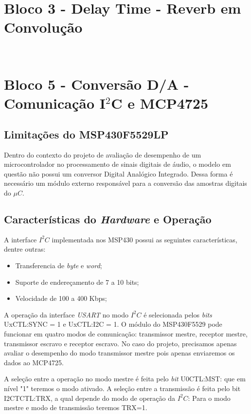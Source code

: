 		
\section{Bloco 3 - Delay Time - Reverb em Convolução}
	\

\section{Bloco 5 - Conversão D/A - Comunicação I$^2$C e MCP4725}
	
	
	\subsection{Limitações do MSP430F5529LP}
		
		Dentro do contexto do projeto de avaliação de desempenho de um microcontrolador no processamento de sinais digitais de áudio, o modelo em questão não possui um conversor Digital Analógico Integrado. Dessa forma é necessário um módulo externo responsável para a conversão das amostras digitais do $\mu C$.
		
	\subsection{Características do \textit{Hardware} e Operação}
	
		A interface $ I^2C $ implementada nos MSP430 possui as seguintes características, dentre outras:
		\begin{itemize}
			\item Transferencia de \textit{byte} e \textit{word};
			\item Suporte de endereçamento de 7 a 10 bits;
			\item Velocidade de 100 a 400 Kbps;
		\end{itemize}
	
		A operação da interface \textit{USART} no modo $ I^2C $ é selecionada pelos \textit{bits} UxCTL:SYNC = 1 e UxCTL:I2C = 1. O módulo do MSP430F5529 pode funcionar em quatro modos de comunicação: transmissor mestre, receptor mestre, transmissor escravo e receptor escravo. No caso do projeto, precisamos apenas avaliar o desempenho do modo transmissor mestre pois apenas enviaremos os dados ao MCP4725.
		
		A seleção entre a operação no modo mestre é feita pelo \textit{bit} U0CTL:MST: que em nível "1" teremos o modo ativado. A seleção entre a transmissão é feita pelo bit I2CTCTL:TRX, a qual depende do modo de operação da $ I^2C $: Para o modo mestre e modo de transmissão teremos TRX=1.
		
